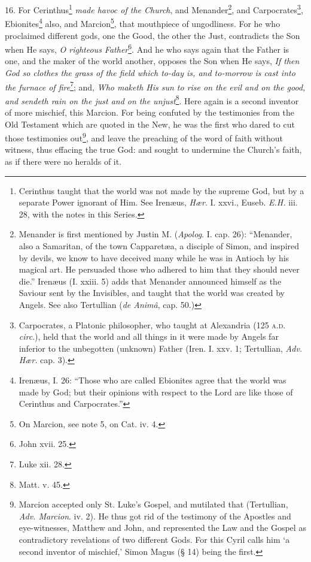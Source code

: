 16. For Cerinthus\footnote{Cerinthus taught that the world was not made by the supreme God, but by a separate Power ignorant of Him. See Irenæus, \emph{Hær}. I. xxvi., Euseb. \emph{E.H.} iii. 28, with the notes in this Series.} \emph{made havoc of the Church}, and Menander\footnote{Menander is first mentioned by Justin M. (\emph{Apolog}. I. cap. 26): “Menander, also a Samaritan, of the town Capparetæa, a disciple of Simon, and inspired by devils, we know to have deceived many while he was in Antioch by his magical art. He persuaded those who adhered to him that they should never die.” Irenæus (I. xxiii. 5) adds that Menander announced himself as the Saviour sent by the Invisibles, and taught that the world was created by Angels. See also Tertullian (\emph{de Animâ}, cap. 50.)}, and Carpocrates\footnote{Carpocrates, a Platonic philosopher, who taught at Alexandria (125 \textsc{a.d.} \emph{circ}.), held that the world and all things in it were made by Angels far inferior to the unbegotten (unknown) Father (Iren. I. xxv. 1; Tertullian, \emph{Adv. Hær.} cap. 3).}, Ebionites\footnote{Irenæus, I. 26: “Those who are called Ebionites agree that the world was made by God; but their opinions with respect to the Lord are like those of Cerinthus and Carpocrates.”} also, and Marcion\footnote{On Marcion, see note 5, on Cat. iv. 4.}, that mouthpiece of ungodliness. For he who proclaimed different gods, one the Good, the other the Just, contradicts the Son when He says, \emph{O righteous Father}\footnote{John xvii. 25.}. And he who says again that the Father is one, and the maker of the world another, opposes the Son when He says, \emph{If then God so clothes the grass of the field which to-day is, and to-morrow is cast into the furnace of fire}\footnote{Luke xii. 28.}; and, \emph{Who maketh His sun to rise on the evil and on the good, and sendeth rain on the just and on the unjust}\footnote{Matt. v. 45.}. Here again is a second inventor of more mischief, this Marcion. For being confuted by the testimonies from the Old Testament which are quoted in the New, he was the first who dared to cut those testimonies out\footnote{Marcion accepted only St. Luke’s Gospel, and mutilated that (Tertullian, \emph{Adv. Marcion}. iv. 2). He thus got rid of the testimony of the Apostles and eye-witnesses, Matthew and John, and represented the Law and the Gospel as contradictory revelations of two different Gods. For this Cyril calls him ‘a second inventor of mischief,’ Simon Magus (§ 14) being the first.}, and leave the preaching of the word of faith without witness, thus effacing the true God: and sought to undermine the Church’s faith, as if there were no heralds of it.

